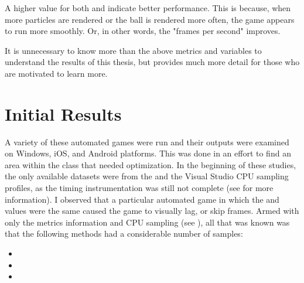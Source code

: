 A higher value for both  and  indicate better performance. This is because, when more particles are rendered or the ball is rendered more often, the game appears to run more smoothly. Or, in other words, the "frames per second" improves. 

It is unnecessary to know more than the above metrics and variables to understand the results of this thesis, but  provides much more detail for those who are motivated to learn more.

\section{Initial Results}\label{sec:game_initial_results}

A variety of these automated games were run and their outputs were examined on Windows, iOS, and Android platforms. This was done in an effort to find an area within the  class that needed optimization. In the beginning of these studies, the only available datasets were from the  and the Visual Studio CPU sampling profiles, as the timing instrumentation was still not complete (see  for more information). I observed that a particular automated game in which the  and  values were the same\footnotemark $ $ caused the game to visually lag, or skip frames. Armed with only the metrics information and CPU sampling (see ), all that was known was that the following  methods had a considerable number of samples:


\begin{itemize}[nolistsep,topsep=0pt]
	\item {}
	\item {}
	\item {}
\end{itemize}

